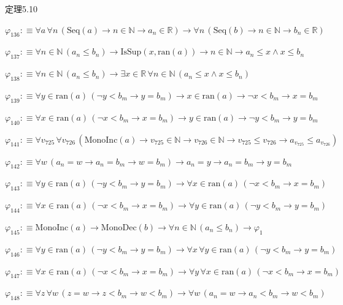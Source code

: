 \begin{fullproof}{定理5.10}
\begin{abbrevlist}
\item $\varphi_{136} :\equiv \forall a\,\forall n\,(\mathrm{Seq}(a) \to n \in \mathbb{N} \to a_{n} \in \mathbb{R}) \to \forall n\,(\mathrm{Seq}(b) \to n \in \mathbb{N} \to b_{n} \in \mathbb{R})$
\item $\varphi_{137} :\equiv \forall n \in \mathbb{N}\,(a_{n} \leq b_{n}) \to \mathrm{IsSup}(x,\mathrm{ran}(a)) \to n \in \mathbb{N} \to a_{n} \leq x \land x \leq b_{n}$
\item $\varphi_{138} :\equiv \forall n \in \mathbb{N}\,(a_{n} \leq b_{n}) \to \exists x \in \mathbb{R}\,\forall n \in \mathbb{N}\,(a_{n} \leq x \land x \leq b_{n})$
\item $\varphi_{139} :\equiv \forall y \in \mathrm{ran}(a)\,(\neg y < b_{m} \to y = b_{m}) \to x \in \mathrm{ran}(a) \to \neg x < b_{m} \to x = b_{m}$
\item $\varphi_{140} :\equiv \forall x \in \mathrm{ran}(a)\,(\neg x < b_{m} \to x = b_{m}) \to y \in \mathrm{ran}(a) \to \neg y < b_{m} \to y = b_{m}$
\item $\varphi_{141} :\equiv \forall v_{725}\,\forall v_{726}\,(\mathrm{MonoInc}(a) \to v_{725} \in \mathbb{N} \to v_{726} \in \mathbb{N} \to v_{725} \leq v_{726} \to a_{v_{725}} \leq a_{v_{726}})$
\item $\varphi_{142} :\equiv \forall w\,(a_{n} = w \to a_{n} = b_{m} \to w = b_{m}) \to a_{n} = y \to a_{n} = b_{m} \to y = b_{m}$
\item $\varphi_{143} :\equiv \forall y \in \mathrm{ran}(a)\,(\neg y < b_{m} \to y = b_{m}) \to \forall x \in \mathrm{ran}(a)\,(\neg x < b_{m} \to x = b_{m})$
\item $\varphi_{144} :\equiv \forall x \in \mathrm{ran}(a)\,(\neg x < b_{m} \to x = b_{m}) \to \forall y \in \mathrm{ran}(a)\,(\neg y < b_{m} \to y = b_{m})$
\item $\varphi_{145} :\equiv \mathrm{MonoInc}(a) \to \mathrm{MonoDec}(b) \to \forall n \in \mathbb{N}\,(a_{n} \leq b_{n}) \to \varphi_{1}$
\item $\varphi_{146} :\equiv \forall y \in \mathrm{ran}(a)\,(\neg y < b_{m} \to y = b_{m}) \to \forall x\,\forall y \in \mathrm{ran}(a)\,(\neg y < b_{m} \to y = b_{m})$
\item $\varphi_{147} :\equiv \forall x \in \mathrm{ran}(a)\,(\neg x < b_{m} \to x = b_{m}) \to \forall y\,\forall x \in \mathrm{ran}(a)\,(\neg x < b_{m} \to x = b_{m})$
\item $\varphi_{148} :\equiv \forall z\,\forall w\,(z = w \to z < b_{m} \to w < b_{m}) \to \forall w\,(a_{n} = w \to a_{n} < b_{m} \to w < b_{m})$

\end{abbrevlist}
\end{fullproof}

